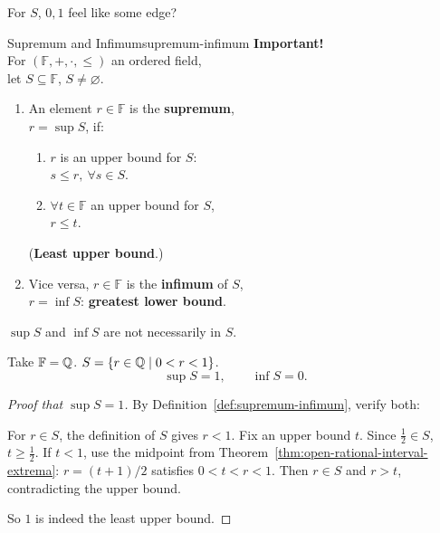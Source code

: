 \begin{thinking}
  For $S$, $0,1$ feel like some edge?
\end{thinking}

\begin{definition}{Supremum and Infimum}{supremum-infimum}
  \textbf{Important!}\\
  For $(\mathbb{F},+,\cdot,\le)$ an ordered field,\\
  let $S\subseteq\mathbb{F}$, $S\ne\varnothing$.
  \begin{enumerate}[label=(\roman*)]
    \item An element $r\in\mathbb{F}$ is the \textbf{supremum},\\
          $r=\sup S$, if:
          \begin{enumerate}[label=(\alph*)]
            \item $r$ is an upper bound for $S$:\\
                  $s\le r,\ \forall s\in S$.
            \item $\forall t\in\mathbb{F}$ an upper bound for $S$,\\
                  $r\le t$.
          \end{enumerate}
          (\textbf{Least upper bound}.)
    \item Vice versa, $r\in\mathbb{F}$ is the \textbf{infimum} of $S$,\\
          $r=\inf S$: \textbf{greatest lower bound}.
  \end{enumerate}
\end{definition}

\begin{note}
  $\sup S$ and $\inf S$ are not necessarily in $S$.
\end{note}

\begin{example}
  Take $\mathbb{F}=\mathbb{Q}$. $S=\{r\in\mathbb{Q}\mid0<r<1\}$.
  \[
    \sup S=1,\qquad\inf S=0.
  \]
  \begin{proof}[Proof that $\sup S=1$]\proofheadingbreak
    By Definition~\ref{def:supremum-infimum}, verify both:
    \begin{enumerate}[proofsubgoals]
      For $r\in S$, the definition of $S$ gives $r<1$.
      Fix an upper bound $t$. Since $\frac12\in S$, $t\ge\frac12$.
      If $t<1$, use the midpoint from Theorem~\ref{thm:open-rational-interval-extrema}:
      $r=(t+1)/2$ satisfies $0<t<r<1$.
      Then $r\in S$ and $r>t$, contradicting the upper bound.
    \end{enumerate}
    So $1$ is indeed the least upper bound.
  \end{proof}
\end{example}

